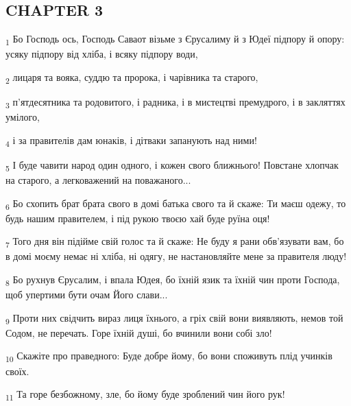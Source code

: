 \subsection{CHAPTER 3}
\begin{tcolorbox}
\textsubscript{1} Бо Господь ось, Господь Саваот візьме з Єрусалиму й з Юдеї підпору й опору: усяку підпору від хліба, і всяку підпору води,
\end{tcolorbox}
\begin{tcolorbox}
\textsubscript{2} лицаря та вояка, суддю та пророка, і чарівника та старого,
\end{tcolorbox}
\begin{tcolorbox}
\textsubscript{3} п'ятдесятника та родовитого, і радника, і в мистецтві премудрого, і в закляттях умілого,
\end{tcolorbox}
\begin{tcolorbox}
\textsubscript{4} і за правителів дам юнаків, і дітваки запанують над ними!
\end{tcolorbox}
\begin{tcolorbox}
\textsubscript{5} І буде чавити народ один одного, і кожен свого ближнього! Повстане хлопчак на старого, а легковажений на поважаного...
\end{tcolorbox}
\begin{tcolorbox}
\textsubscript{6} Бо схопить брат брата свого в домі батька свого та й скаже: Ти маєш одежу, то будь нашим правителем, і під рукою твоєю хай буде руїна оця!
\end{tcolorbox}
\begin{tcolorbox}
\textsubscript{7} Того дня він підійме свій голос та й скаже: Не буду я рани обв'язувати вам, бо в домі моєму немає ні хліба, ні одягу, не настановляйте мене за правителя люду!
\end{tcolorbox}
\begin{tcolorbox}
\textsubscript{8} Бо рухнув Єрусалим, і впала Юдея, бо їхній язик та їхній чин проти Господа, щоб упертими бути очам Його слави...
\end{tcolorbox}
\begin{tcolorbox}
\textsubscript{9} Проти них свідчить вираз лиця їхнього, а гріх свій вони виявляють, немов той Содом, не перечать. Горе їхній душі, бо вчинили вони собі зло!
\end{tcolorbox}
\begin{tcolorbox}
\textsubscript{10} Скажіте про праведного: Буде добре йому, бо вони споживуть плід учинків своїх.
\end{tcolorbox}
\begin{tcolorbox}
\textsubscript{11} Та горе безбожному, зле, бо йому буде зроблений чин його рук!
\end{tcolorbox}
